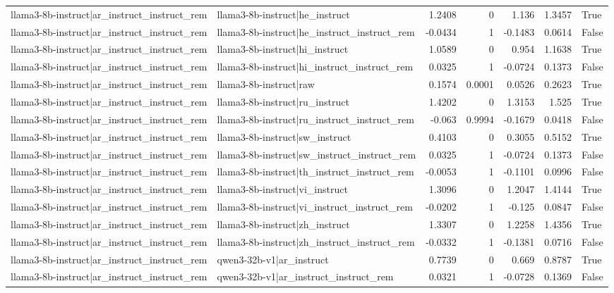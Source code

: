 \begin{table}
\begin{tabular}{l l r r r r l}
llama3-8b-instruct|ar_instruct_instruct_rem & llama3-8b-instruct|he_instruct & 1.2408 & 0 & 1.136 & 1.3457 & True \\
llama3-8b-instruct|ar_instruct_instruct_rem & llama3-8b-instruct|he_instruct_instruct_rem & -0.0434 & 1 & -0.1483 & 0.0614 & False \\
llama3-8b-instruct|ar_instruct_instruct_rem & llama3-8b-instruct|hi_instruct & 1.0589 & 0 & 0.954 & 1.1638 & True \\
llama3-8b-instruct|ar_instruct_instruct_rem & llama3-8b-instruct|hi_instruct_instruct_rem & 0.0325 & 1 & -0.0724 & 0.1373 & False \\
llama3-8b-instruct|ar_instruct_instruct_rem & llama3-8b-instruct|raw & 0.1574 & 0.0001 & 0.0526 & 0.2623 & True \\
llama3-8b-instruct|ar_instruct_instruct_rem & llama3-8b-instruct|ru_instruct & 1.4202 & 0 & 1.3153 & 1.525 & True \\
llama3-8b-instruct|ar_instruct_instruct_rem & llama3-8b-instruct|ru_instruct_instruct_rem & -0.063 & 0.9994 & -0.1679 & 0.0418 & False \\
llama3-8b-instruct|ar_instruct_instruct_rem & llama3-8b-instruct|sw_instruct & 0.4103 & 0 & 0.3055 & 0.5152 & True \\
llama3-8b-instruct|ar_instruct_instruct_rem & llama3-8b-instruct|sw_instruct_instruct_rem & 0.0325 & 1 & -0.0724 & 0.1373 & False \\
llama3-8b-instruct|ar_instruct_instruct_rem & llama3-8b-instruct|th_instruct_instruct_rem & -0.0053 & 1 & -0.1101 & 0.0996 & False \\
llama3-8b-instruct|ar_instruct_instruct_rem & llama3-8b-instruct|vi_instruct & 1.3096 & 0 & 1.2047 & 1.4144 & True \\
llama3-8b-instruct|ar_instruct_instruct_rem & llama3-8b-instruct|vi_instruct_instruct_rem & -0.0202 & 1 & -0.125 & 0.0847 & False \\
llama3-8b-instruct|ar_instruct_instruct_rem & llama3-8b-instruct|zh_instruct & 1.3307 & 0 & 1.2258 & 1.4356 & True \\
llama3-8b-instruct|ar_instruct_instruct_rem & llama3-8b-instruct|zh_instruct_instruct_rem & -0.0332 & 1 & -0.1381 & 0.0716 & False \\
llama3-8b-instruct|ar_instruct_instruct_rem & qwen3-32b-v1|ar_instruct & 0.7739 & 0 & 0.669 & 0.8787 & True \\
llama3-8b-instruct|ar_instruct_instruct_rem & qwen3-32b-v1|ar_instruct_instruct_rem & 0.0321 & 1 & -0.0728 & 0.1369 & False \\

\end{tabular}
\end{table}
